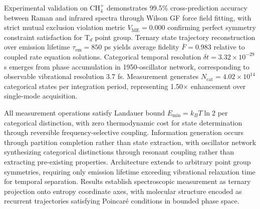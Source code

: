 \documentclass[twocolumn,10pt]{article}
\begin{document}
Experimental validation on CH$_4^+$ demonstrates 99.5\% cross-prediction accuracy between Raman and infrared spectra through Wilson GF force field fitting, with strict mutual exclusion violation metric $V_{\text{ME}} = 0.000$ confirming perfect symmetry constraint satisfaction for T$_d$ point group. Ternary state trajectory reconstruction over emission lifetime $\tau_{\text{em}} = 850$ ps yields average fidelity $\bar{F} = 0.983$ relative to coupled rate equation solutions. Categorical temporal resolution $\delta t = 3.32 \times 10^{-29}$ s emerges from phase accumulation in 1950-oscillator network, corresponding to observable vibrational resolution 3.7 fs. Measurement generates $N_{\text{cat}} = 4.02 \times 10^{14}$ categorical states per integration period, representing 1.50$\times$ enhancement over single-mode acquisition.

All measurement operations satisfy Landauer bound $E_{\min} = k_B T \ln 2$ per categorical distinction, with zero thermodynamic cost for state determination through reversible frequency-selective coupling. Information generation occurs through partition completion rather than state extraction, with oscillator network synthesizing categorical distinctions through resonant coupling rather than extracting pre-existing properties. Architecture extends to arbitrary point group symmetries, requiring only emission lifetime exceeding vibrational relaxation time for temporal separation. Results establish spectroscopic measurement as ternary projection onto entropy coordinate axes, with molecular structure encoded as recurrent trajectories satisfying Poincar\'e conditions in bounded phase space.



\end{document}

